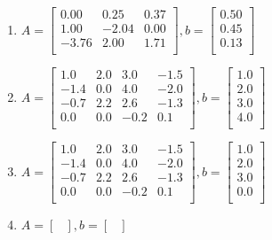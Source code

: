 \documentclass[a4paper]{article}
\begin{document}
\begin{enumerate}
\begin{enumerate}
  \item
    $A = \begin{bmatrix}
      0.00 & 0.25 & 0.37\\
      1.00 & -2.04 & 0.00\\
      -3.76 & 2.00 & 1.71\\
      \end{bmatrix},
      b= \begin{bmatrix}
        0.50\\
        0.45\\
        0.13\\
      \end{bmatrix}$

  \item
    $A = \begin{bmatrix}
      1.0 & 2.0 & 3.0 & -1.5\\
      -1.4 & 0.0 & 4.0 & -2.0\\
      -0.7 & 2.2 & 2.6 & -1.3\\
      0.0 & 0.0 & -0.2 & 0.1\\
      \end{bmatrix},
      b= \begin{bmatrix}
        1.0\\
        2.0\\
        3.0\\
        4.0\\
      \end{bmatrix}$

  \item
    $A = \begin{bmatrix}
      1.0 & 2.0 & 3.0 & -1.5\\
      -1.4 & 0.0 & 4.0 & -2.0\\
      -0.7 & 2.2 & 2.6 & -1.3\\
      0.0 & 0.0 & -0.2 & 0.1\\
      \end{bmatrix},
      b= \begin{bmatrix}
        1.0\\
        2.0\\
        3.0\\
        0.0\\
      \end{bmatrix}$

  \item 
    $A = \begin{bmatrix}
      \\
      \end{bmatrix},
      b= \begin{bmatrix}
        \\
      \end{bmatrix}$

  \end{enumerate}

\end{enumerate}
\end{document}
